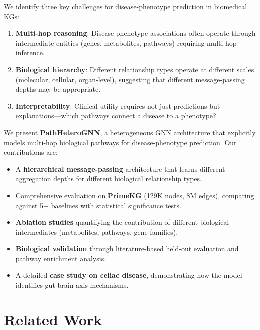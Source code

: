\documentclass[twoside]{article}
\begin{document}
We identify three key challenges for disease-phenotype prediction in biomedical KGs:

\begin{enumerate}
    \item \textbf{Multi-hop reasoning}: Disease-phenotype associations often operate through intermediate entities (genes, metabolites, pathways) requiring multi-hop inference.
    
    \item \textbf{Biological hierarchy}: Different relationship types operate at different scales (molecular, cellular, organ-level), suggesting that different message-passing depths may be appropriate.
    
    \item \textbf{Interpretability}: Clinical utility requires not just predictions but explanations—which pathways connect a disease to a phenotype?
\end{enumerate}

We present \textbf{PathHeteroGNN}, a heterogeneous GNN architecture that explicitly models multi-hop biological pathways for disease-phenotype prediction. Our contributions are:

\begin{itemize}
    \item A \textbf{hierarchical message-passing} architecture that learns different aggregation depths for different biological relationship types.
    
    \item Comprehensive evaluation on \textbf{PrimeKG} (129K nodes, 8M edges), comparing against 5+ baselines with statistical significance tests.
    
    \item \textbf{Ablation studies} quantifying the contribution of different biological intermediates (metabolites, pathways, gene families).
    
    \item \textbf{Biological validation} through literature-based held-out evaluation and pathway enrichment analysis.
    
    \item A detailed \textbf{case study on celiac disease}, demonstrating how the model identifies gut-brain axis mechanisms.
\end{itemize}

\section{Related Work}
\end{document}
